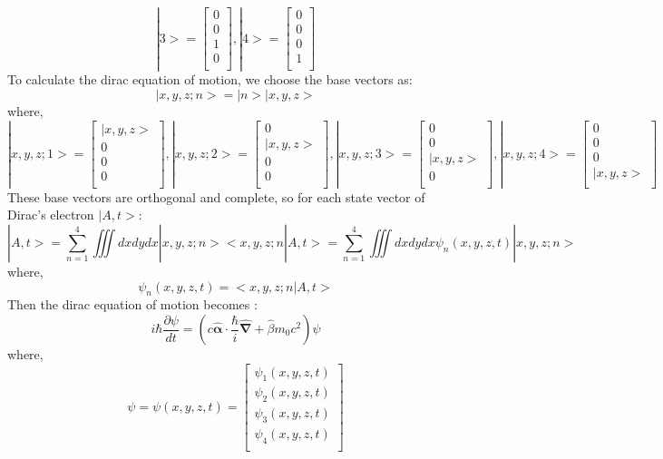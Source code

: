 \documentclass[12pt]{article}
\numberwithin{equation}{section}
\begin{document}
\begin{enumerate}
\[	|3>=\begin{bmatrix}0\\ 0\\ 1\\ 0\\\end{bmatrix}, |4>=\begin{bmatrix}0\\ 0\\ 0\\ 1\\\end{bmatrix}\]
	To calculate the dirac equation of motion, we choose the base vectors as:
	\begin{equation}|x,y,z;n>=|n>|x,y,z>\end{equation}
	where,
	\[|x,y,z;1>=\begin{bmatrix}|x,y,z>\\ 0\\ 0\\ 0\\ \end{bmatrix},
	|x,y,z;2>=\begin{bmatrix}0\\ |x,y,z>\\ 0\\ 0\\ \end{bmatrix},
	|x,y,z;3>=\begin{bmatrix}0\\ 0\\ |x,y,z>\\ 0\\ \end{bmatrix},
	|x,y,z;4>=\begin{bmatrix}0\\ 0\\ 0\\ |x,y,z>\\ \end{bmatrix}\]
	These base vectors are orthogonal and complete, so for each state vector of Dirac's electron $|A,t>$:
	\[|A,t>=\sum_{n=1}^4\iiint dxdydx |x,y,z;n><x,y,z;n|A,t>=\sum_{n=1}^4\iiint dxdydx\psi_n(x,y,z,t) |x,y,z;n>\]
	where,
	\[\psi_n(x,y,z,t)=<x,y,z;n|A,t>\]
	Then the dirac equation of motion becomes :
	\begin{equation}i\hbar\frac{\partial{\psi}}{dt}=
	(c\hat{\mathbf{\alpha}}\cdot\frac{\hbar}{i}\hat{\mathbf{\nabla}}+\hat{\beta} m_0c^2)\psi\end{equation}
	where,
	\[\psi=\psi(x,y,z,t)=\begin{bmatrix}\psi_1(x,y,z,t) \\ \psi_2(x,y,z,t) \\ \psi_3(x,y,z,t) \\ \psi_4(x,y,z,t) \\\end{bmatrix}
\]
\end{enumerate}
\end{document}
